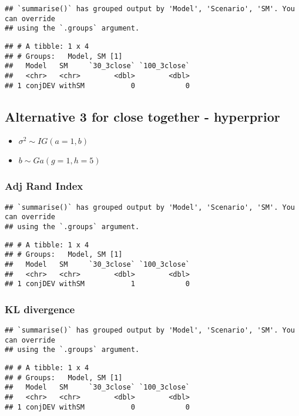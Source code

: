 \documentclass[
]{article}
\providecommand{\tightlist}{%
  \setlength{\itemsep}{0pt}\setlength{\parskip}{0pt}}
\begin{document}
\begin{verbatim}
## `summarise()` has grouped output by 'Model', 'Scenario', 'SM'. You can override
## using the `.groups` argument.
\end{verbatim}

\begin{verbatim}
## # A tibble: 1 x 4
## # Groups:   Model, SM [1]
##   Model   SM     `30_3close` `100_3close`
##   <chr>   <chr>        <dbl>        <dbl>
## 1 conjDEV withSM           0            0
\end{verbatim}

\hypertarget{alternative-3-for-close-together---hyperprior}{%
\subsection{Alternative 3 for close together -
hyperprior}\label{alternative-3-for-close-together---hyperprior}}

\begin{itemize}
\tightlist
\item
  \(\sigma^2 \sim IG(a=1, b)\)
\item
  \(b \sim Ga(g = 1, h = 5)\)
\end{itemize}

\hypertarget{adj-rand-index-3}{%
\subsubsection{Adj Rand Index}\label{adj-rand-index-3}}

\begin{verbatim}
## `summarise()` has grouped output by 'Model', 'Scenario', 'SM'. You can override
## using the `.groups` argument.
\end{verbatim}

\begin{verbatim}
## # A tibble: 1 x 4
## # Groups:   Model, SM [1]
##   Model   SM     `30_3close` `100_3close`
##   <chr>   <chr>        <dbl>        <dbl>
## 1 conjDEV withSM           1            0
\end{verbatim}

\hypertarget{kl-divergence-3}{%
\subsubsection{KL divergence}\label{kl-divergence-3}}

\begin{verbatim}
## `summarise()` has grouped output by 'Model', 'Scenario', 'SM'. You can override
## using the `.groups` argument.
\end{verbatim}

\begin{verbatim}
## # A tibble: 1 x 4
## # Groups:   Model, SM [1]
##   Model   SM     `30_3close` `100_3close`
##   <chr>   <chr>        <dbl>        <dbl>
## 1 conjDEV withSM           0            0
\end{verbatim}
\end{document}
